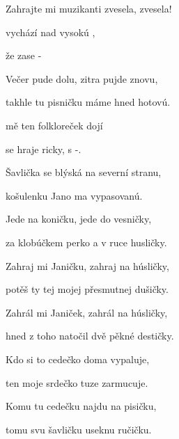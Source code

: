 

Zahrajte mi muzikanti zvesela, zvesela!

\zs
{} vychází nad vysokú ,

 že   zase -

Večer pude dolu, zitra pujde znovu,

takhle tu pisničku máme hned hotovú.
\ks

\zr
{} mě ten folkloreček {do}{jí}

 se hraje ricky,  s -.
\kr

\zs
Šavlička se blýská na severní stranu,

košulenku Jano ma vypasovanú.

Jede na koničku, jede do vesničky,

za klobúčkem perko a v ruce husličky.
\ks

\zr  \kr

\zs
Zahraj mi Janičku, zahraj na húsličky,

potěš ty tej mojej přesmutnej dušičky.

Zahrál mi Janiček, zahrál na húsličky,

hned z toho natočil dvě pěkné destičky.

\ks

\zr  \kr

\zs
Kdo si to cedečko doma vypaluje,

ten moje srdečko tuze zarmucuje.

Komu tu cedečku najdu na pisičku,

tomu svu šavličku useknu ručičku.
\ks

\zr  \kr

\kp






